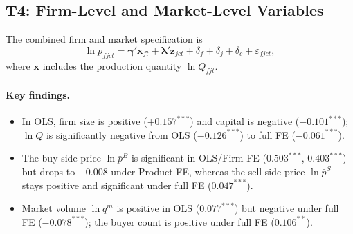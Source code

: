 \documentclass[12pt]{article}
\begin{document}
\subsection{T4: Firm-Level and Market-Level Variables}
\label{sec:t4}

The combined firm and market specification is
\begin{equation}
  \ln p_{fjct}
  = \boldsymbol{\gamma}' \mathbf{x}_{ft}
  + \boldsymbol{\lambda}' \mathbf{z}_{jct}
  + \delta_f + \delta_j + \delta_c
  + \varepsilon_{fjct},
  \label{eq:t4}
\end{equation}
where \(\mathbf{x}\) includes the production quantity \(\ln Q_{fjt}\).

\paragraph{Key findings.}
\begin{itemize}[leftmargin=1.5em,nosep]
  \item In OLS, firm size is positive (\(+0.157^{***}\)) and capital is negative
    (\(-0.101^{***}\)); \(\ln Q\) is significantly negative from OLS
    (\(-0.126^{***}\)) to full FE (\(-0.061^{***}\)).
  \item The buy-side price \(\ln\bar{p}^{B}\) is significant in OLS/Firm FE
    (\(0.503^{***}\), \(0.403^{***}\)) but drops to \(-0.008\) under Product FE,
    whereas the sell-side price \(\ln\bar{p}^{S}\) stays positive and significant
    under full FE (\(0.047^{***}\)).
  \item Market volume \(\ln q^{m}\) is positive in OLS (\(0.077^{***}\)) but
    negative under full FE (\(-0.078^{***}\)); the buyer count is positive under
    full FE (\(0.106^{**}\)).
\end{itemize}
\end{document}
